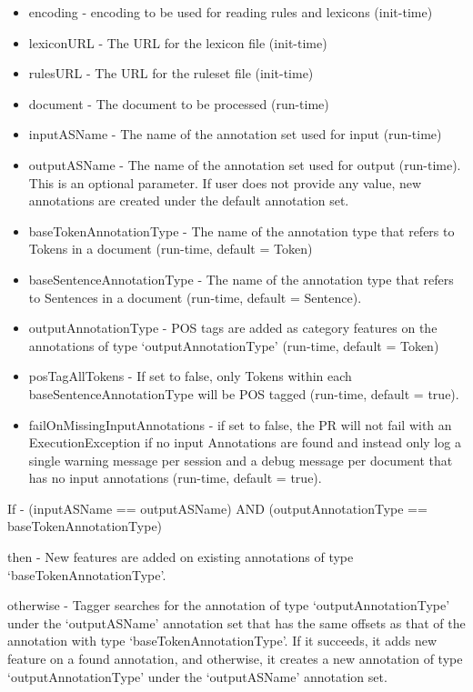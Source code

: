 \begin{itemize}
\item encoding - encoding to be used for reading rules and lexicons (init-time)
\item lexiconURL - The URL for the lexicon file (init-time)
\item rulesURL - The URL for the ruleset file (init-time)
\item document - The document to be processed (run-time)
\item inputASName - The name of the annotation set used for input (run-time)
\item outputASName - The name of the annotation set used for output (run-time).  This is an optional parameter. If user does not provide any value, new annotations are created under the default annotation set.
\item baseTokenAnnotationType - The name of the annotation type that refers to Tokens in a document (run-time, default = Token)
\item baseSentenceAnnotationType - The name of the annotation type that refers to Sentences in a document (run-time, default = Sentence).
\item outputAnnotationType - POS tags are added as category features on the annotations of type `outputAnnotationType' (run-time, default = Token)
\item posTagAllTokens - If set to false, only Tokens within each baseSentenceAnnotationType will be POS tagged (run-time, default = true).
\item failOnMissingInputAnnotations - if set to false, the PR will not fail with
an ExecutionException if no input Annotations are found and instead only log a 
single warning message per session and a debug message per document that has no
input annotations (run-time, default = true). 
\end{itemize}

If - (inputASName == outputASName) AND (outputAnnotationType ==
baseTokenAnnotationType)

then - 
New features are added on existing annotations of type `baseTokenAnnotationType'.

otherwise - Tagger searches for the annotation of type
`outputAnnotationType' under the `outputASName' annotation set
that has the same offsets as that of the annotation with type
`baseTokenAnnotationType'.  If it succeeds, it adds new feature on a
found annotation, and otherwise, it creates a new annotation of type
`outputAnnotationType' under the `outputASName' annotation set.

